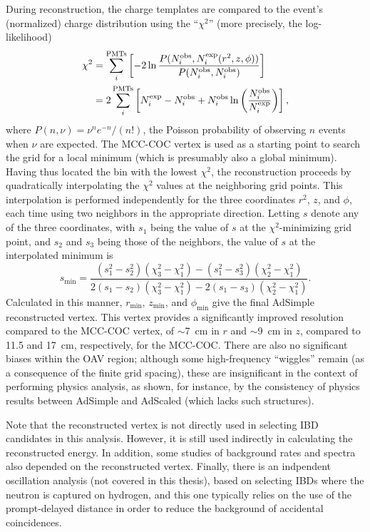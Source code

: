 \documentclass[../thesis.tex]{subfiles}
\begin{document}
During reconstruction, the charge templates are compared to the event's (normalized) charge distribution using the ``$\chi^2$'' (more precisely, the log-likelihood)
\begin{align*}
  \chi^2 &= \sum_i^{\mathrm{PMTs}}\left[ -2 \ln \frac{P(N_i^{\mathrm{obs}}, N_i^{\mathrm{exp}}(r^2, z, \phi))}
        {P(N_i^{\mathrm{obs}}, N_i^{\mathrm{obs}})} \right] \\
      &= 2 \sum_i^{\mathrm{PMTs}} \left[ N_i^{\mathrm{exp}} - N_i^{\mathrm{obs}}+ N_i^{\mathrm{obs}} \ln \left( \frac{N_i^{\mathrm{obs}}}{N_i^{\mathrm{exp}}} \right) \right],
\end{align*}
where $P(n, \nu) = \nu^n e^{-n} / (n!)$, the Poisson probability of observing $n$ events when $\nu$ are expected. The MCC-COC vertex is used as a starting point to search the grid for a local minimum (which is presumably also a global minimum). Having thus located the bin with the lowest $\chi^2$, the reconstruction proceeds by quadratically interpolating the $\chi^2$ values at the neighboring grid points. This interpolation is performed independently for the three coordinates $r^2$, $z$, and $\phi$, each time using two neighbors in the appropriate direction. Letting $s$ denote any of the three coordinates, with $s_1$ being the value of $s$ at the $\chi^2$-minimizing grid point, and $s_2$ and $s_3$ being those of the neighbors, the value of $s$ at the interpolated minimum is
\begin{equation*}
  s_{\mathrm{min}} = \frac{(s_1^2 - s_2^2)(\chi_3^2 - \chi_1^2) - (s_1^2 - s_3^2)(\chi_2^2 - \chi_1^2)}{2(s_1 - s_2)(\chi_3^2 - \chi_1^2) - 2(s_1 - s_3)(\chi_2^2 - \chi_1^2)}.
\end{equation*}
Calculated in this manner, $r_{\mathrm{min}}$, $z_{\mathrm{min}}$, and $\phi_{\mathrm{min}}$ give the final AdSimple reconstructed vertex. This vertex provides a significantly improved resolution compared to the MCC-COC vertex, of $\sim$7~cm in $r$ and $\sim$9~cm in $z$, compared to 11.5 and 17~cm, respectively, for the MCC-COC. There are also no significant biases within the OAV region; although some high-frequency ``wiggles'' remain (as a consequence of the finite grid spacing), these are insignificant in the context of performing physics analysis, as shown, for instance, by the consistency of physics results between AdSimple and AdScaled (which lacks such structures).

Note that the reconstructed vertex is not directly used in selecting IBD candidates in this analysis. However, it is still used indirectly in calculating the reconstructed energy. In addition, some studies of background rates and spectra also depended on the reconstructed vertex. Finally, there is an indpendent oscillation analysis (not covered in this thesis), based on selecting IBDs where the neutron is captured on hydrogen, and this one typically relies on the use of the prompt-delayed distance in order to reduce the background of accidental coincidences.
\end{document}
